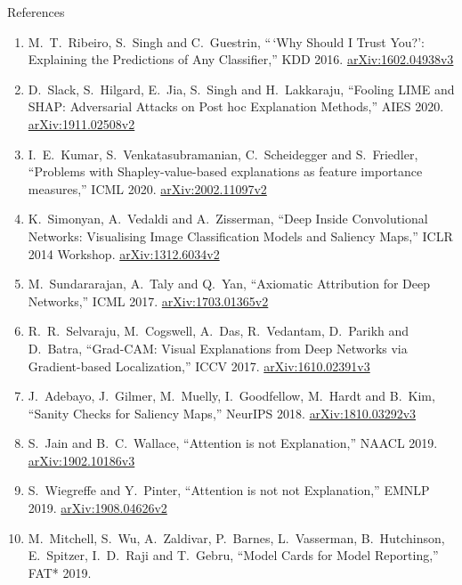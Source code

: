 \begin{frame}[allowframebreaks]{References}
\begin{enumerate}
          (preprint: \href{https://arxiv.org/abs/1905.04610v1}{arXiv:1905.04610v1}, ``Explainable AI
          for Trees'')
    \item M.~T.~Ribeiro, S.~Singh and C.~Guestrin, ``\,`Why Should I Trust You?': Explaining the
          Predictions of Any Classifier,'' KDD 2016.
          \href{https://arxiv.org/abs/1602.04938v3}{arXiv:1602.04938v3}
    \item D.~Slack, S.~Hilgard, E.~Jia, S.~Singh and H.~Lakkaraju, ``Fooling LIME and SHAP:
          Adversarial Attacks on Post hoc Explanation Methods,'' AIES 2020.
          \href{https://arxiv.org/abs/1911.02508v2}{arXiv:1911.02508v2}
    \item I.~E.~Kumar, S.~Venkatasubramanian, C.~Scheidegger and S.~Friedler, ``Problems with
          Shapley-value-based explanations as feature importance measures,'' ICML 2020.
          \href{https://arxiv.org/abs/2002.11097v2}{arXiv:2002.11097v2}
    \item K.~Simonyan, A.~Vedaldi and A.~Zisserman, ``Deep Inside Convolutional Networks:
          Visualising Image Classification Models and Saliency Maps,'' ICLR 2014 Workshop.
          \href{https://arxiv.org/abs/1312.6034v2}{arXiv:1312.6034v2}
    \item M.~Sundararajan, A.~Taly and Q.~Yan, ``Axiomatic Attribution for Deep Networks,''
          ICML 2017. \href{https://arxiv.org/abs/1703.01365v2}{arXiv:1703.01365v2}
    \item R.~R.~Selvaraju, M.~Cogswell, A.~Das, R.~Vedantam, D.~Parikh and D.~Batra, ``Grad-CAM:
          Visual Explanations from Deep Networks via Gradient-based Localization,'' ICCV 2017.
          \href{https://arxiv.org/abs/1610.02391v3}{arXiv:1610.02391v3}
    \item J.~Adebayo, J.~Gilmer, M.~Muelly, I.~Goodfellow, M.~Hardt and B.~Kim, ``Sanity Checks for
          Saliency Maps,'' NeurIPS 2018. \href{https://arxiv.org/abs/1810.03292v3}{arXiv:1810.03292v3}
    \item S.~Jain and B.~C.~Wallace, ``Attention is not Explanation,'' NAACL 2019.
          \href{https://arxiv.org/abs/1902.10186v3}{arXiv:1902.10186v3}
    \item S.~Wiegreffe and Y.~Pinter, ``Attention is not not Explanation,'' EMNLP 2019.
          \href{https://arxiv.org/abs/1908.04626v2}{arXiv:1908.04626v2}
    \item M.~Mitchell, S.~Wu, A.~Zaldivar, P.~Barnes, L.~Vasserman, B.~Hutchinson, E.~Spitzer,
          I.~D.~Raji and T.~Gebru, ``Model Cards for Model Reporting,'' FAT* 2019.

\end{enumerate}
\end{frame}
